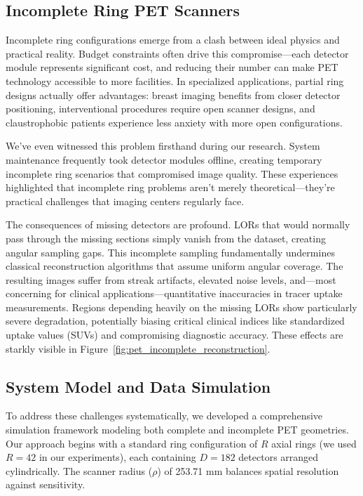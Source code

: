 \documentclass[
reprint,
superscriptaddress,
nofootinbib,
amsmath,amssymb,
aps,
prd,
]{revtex4-2}
\begin{document}
\subsection{Incomplete Ring PET Scanners}

Incomplete ring configurations emerge from a clash between ideal physics and practical reality. Budget constraints often drive this compromise—each detector module represents significant cost, and reducing their number can make PET technology accessible to more facilities. In specialized applications, partial ring designs actually offer advantages: breast imaging benefits from closer detector positioning, interventional procedures require open scanner designs, and claustrophobic patients experience less anxiety with more open configurations.

We've even witnessed this problem firsthand during our research. System maintenance frequently took detector modules offline, creating temporary incomplete ring scenarios that compromised image quality. These experiences highlighted that incomplete ring problems aren't merely theoretical—they're practical challenges that imaging centers regularly face.

The consequences of missing detectors are profound. LORs that would normally pass through the missing sections simply vanish from the dataset, creating angular sampling gaps. This incomplete sampling fundamentally undermines classical reconstruction algorithms that assume uniform angular coverage. The resulting images suffer from streak artifacts, elevated noise levels, and—most concerning for clinical applications—quantitative inaccuracies in tracer uptake measurements. Regions depending heavily on the missing LORs show particularly severe degradation, potentially biasing critical clinical indices like standardized uptake values (SUVs) and compromising diagnostic accuracy. These effects are starkly visible in Figure~\ref{fig:pet_incomplete_reconstruction}.

\subsection{System Model and Data Simulation}

To address these challenges systematically, we developed a comprehensive simulation framework modeling both complete and incomplete PET geometries. Our approach begins with a standard ring configuration of $R$ axial rings (we used $R=42$ in our experiments), each containing $D=182$ detectors arranged cylindrically. The scanner radius ($\rho$) of 253.71 mm balances spatial resolution against sensitivity.
\end{document}
